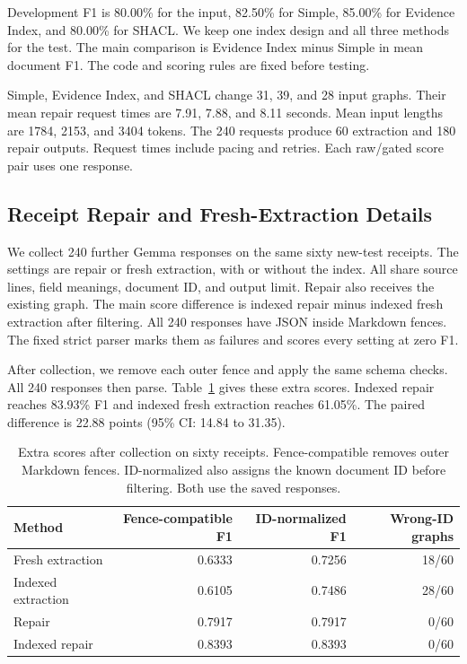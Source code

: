 Development F1 is 80.00\% for the input, 82.50\% for Simple,
85.00\% for Evidence Index, and 80.00\% for SHACL.
We keep one index design and all three methods for the test.
The main comparison is Evidence Index minus Simple in mean document F1.
The code and scoring rules are fixed before testing.

Simple, Evidence Index, and SHACL change 31, 39, and 28 input graphs.
Their mean repair request times are 7.91, 7.88, and 8.11 seconds.
Mean input lengths are 1784, 2153, and 3404 tokens.
The 240 requests produce 60 extraction and 180 repair outputs.
Request times include pacing and retries. Each raw/gated score pair uses
one response.

\subsection{Receipt Repair and Fresh-Extraction Details}
\label{app:reextraction_diagnostics}

We collect 240 further Gemma responses on the same sixty new-test receipts.
The settings are repair or fresh extraction, with or without the index.
All share source lines, field meanings, document ID, and output limit.
Repair also receives the existing graph. The main score difference is
indexed repair minus indexed fresh extraction after filtering.
All 240 responses have JSON inside Markdown fences.
The fixed strict parser marks them as failures and scores every setting
at zero F1.

After collection, we remove each outer fence and apply the same schema
checks. All 240 responses then parse.
Table~\ref{tab:reextraction_recovery} gives these extra scores.
Indexed repair reaches 83.93\% F1 and indexed fresh extraction reaches
61.05\%. The paired difference is 22.88 points
(95\% CI: 14.84 to 31.35).

\begin{table}[t]
\centering
\caption{Extra scores after collection on sixty receipts. Fence-compatible removes outer Markdown fences. ID-normalized also assigns the known document ID before filtering. Both use the saved responses.}
\label{tab:reextraction_recovery}
\small
\begin{tabular}{lrrr}
\toprule
Method & Fence-compatible F1 & ID-normalized F1 & Wrong-ID graphs \\
\midrule
Fresh extraction & 0.6333 & 0.7256 & 18/60 \\
Indexed extraction & 0.6105 & 0.7486 & 28/60 \\
Repair & 0.7917 & 0.7917 & 0/60 \\
Indexed repair & 0.8393 & 0.8393 & 0/60 \\
\bottomrule
\end{tabular}
\end{table}

